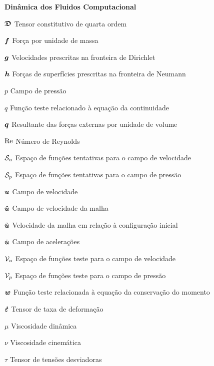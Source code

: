 \begin{simbolos}
  \item[\textbf{Dinâmica dos Fluidos Computacional}]
  \item[$\boldsymbol{\mathfrak{D}}$] Tensor constitutivo de quarta ordem
  \item[$\boldsymbol{f}$] Força por unidade de massa
  \item[$\boldsymbol{g}$] Velocidades prescritas na fronteira de Dirichlet
  \item[$\boldsymbol{h}$] Forças de superfícies prescritas na fronteira de Neumann
  \item[$p$] Campo de pressão
  \item[$q$] Função teste relacionado à equação da continuidade
  \item[$\boldsymbol{q}$] Resultante das forças externas por unidade de volume
  \item[$\mathrm{Re}$] Número de Reynolds
  \item[$\mathcal{S}_u$] Espaço de funções tentativas para o campo de velocidade
  \item[$\mathcal{S}_p$] Espaço de funções tentativas para o campo de pressão
  \item[$\boldsymbol{u}$] Campo de velocidade
  \item[$\boldsymbol{\hat{u}}$] Campo de velocidade da malha
  \item[$\tilde{\boldsymbol{u}}$] Velocidade da malha em relação à configuração inicial
  \item[$\dot{\boldsymbol{u}}$] Campo de acelerações
  \item[$\mathcal{V}_u$] Espaço de funções teste para o campo de velocidade
  \item[$\mathcal{V}_p$] Espaço de funções teste para o campo de pressão
  \item[$\boldsymbol{w}$] Função teste relacionada à equação da conservação do momento
  \item[$\boldsymbol{\dot{\varepsilon}}$] Tensor de taxa de deformação
  \item[$\mu$] Viscosidade dinâmica
  \item[$\nu$] Viscosidade cinemática
  \item[$\tau$] Tensor de tensões desviadoras


\end{simbolos}
